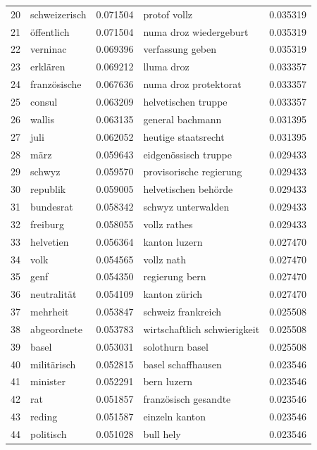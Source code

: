 \documentclass[11pt]{article}
\begin{document}
\begin{table}[H]
\begin{small}
\begin{center}
\begin{tabular*}{\textwidth}{|l|| @{\extracolsep{\fill}} l c || l c |}
20 	& 	schweizerisch 	& 	0.071504 	& 	protof vollz 	& 	0.035319 	\\
21 	& 	öffentlich 	& 	0.071504 	& 	numa droz wiedergeburt 	& 	0.035319 	\\
22 	& 	verninac 	& 	0.069396 	& 	verfassung geben 	& 	0.035319 	\\
23 	& 	erklären 	& 	0.069212 	& 	lluma droz 	& 	0.033357 	\\
24 	& 	französische 	& 	0.067636 	& 	numa droz protektorat 	& 	0.033357 	\\
25 	& 	consul 	& 	0.063209 	& 	helvetischen truppe 	& 	0.033357 	\\
26 	& 	wallis 	& 	0.063135 	& 	general bachmann 	& 	0.031395 	\\
27 	& 	juli 	& 	0.062052 	& 	heutige staatsrecht 	& 	0.031395 	\\
28 	& 	märz 	& 	0.059643 	& 	eidgenössisch truppe 	& 	0.029433 	\\
29 	& 	schwyz 	& 	0.059570 	& 	provisorische regierung 	& 	0.029433 	\\
30 	& 	republik 	& 	0.059005 	& 	helvetischen behörde 	& 	0.029433 	\\
31 	& 	bundesrat 	& 	0.058342 	& 	schwyz unterwalden 	& 	0.029433 	\\
32 	& 	freiburg 	& 	0.058055 	& 	vollz rathes 	& 	0.029433 	\\
33 	& 	helvetien 	& 	0.056364 	& 	kanton luzern 	& 	0.027470 	\\
34 	& 	volk 	& 	0.054565 	& 	vollz nath 	& 	0.027470 	\\
35 	& 	genf 	& 	0.054350 	& 	regierung bern 	& 	0.027470 	\\
36 	& 	neutralität 	& 	0.054109 	& 	kanton zürich 	& 	0.027470 	\\
37 	& 	mehrheit 	& 	0.053847 	& 	schweiz frankreich 	& 	0.025508 	\\
38 	& 	abgeordnete 	& 	0.053783 	& 	wirtschaftlich schwierigkeit 	& 	0.025508 	\\
39 	& 	basel 	& 	0.053031 	& 	solothurn basel 	& 	0.025508 	\\
40 	& 	militärisch 	& 	0.052815 	& 	basel schaffhausen 	& 	0.023546 	\\
41 	& 	minister 	& 	0.052291 	& 	bern luzern 	& 	0.023546 	\\
42 	& 	rat 	& 	0.051857 	& 	französisch gesandte 	& 	0.023546 	\\
43 	& 	reding 	& 	0.051587 	& 	einzeln kanton 	& 	0.023546 	\\
44 	& 	politisch 	& 	0.051028 	& 	bull hely 	& 	0.023546 	\\

\end{tabular*}
\end{center}
\end{small}
\end{table}
\end{document}
